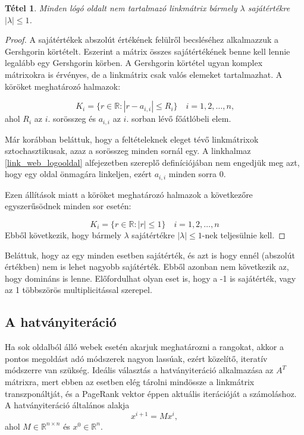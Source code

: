 \documentclass[12pt,a4paper]{article}
\newtheorem{tetel}{Tétel}
\begin{document}
\begin{tetel}
	Minden lógó oldalt nem tartalmazó linkmátrix bármely $\lambda$ sajátértékre $ |\lambda| \leq 1$.
\end{tetel}
\begin{proof}
	A sajátértékek abszolút értékének felülről becsléséhez alkalmazzuk a Gershgorin körtételt. Eszerint a mátrix összes sajátértékének benne kell lennie legalább egy Gershgorin körben. A Gershgorin körtétel ugyan komplex mátrixokra is érvényes, de a linkmátrix csak valós elemeket tartalmazhat. A köröket meghatározó halmazok: 
	
	\[ K_i = \{ r \in \mathbb{R}: |r - a_{i,i}| \leq R_i \} \quad i = 1,2,\ldots,n \text{,} \]
	ahol $R_i$ az $i$. sorösszeg és $a_{i,i}$ az $i$. sorban lévő főátlóbeli elem.
	
	Már korábban beláttuk, hogy a feltételeknek eleget tévő linkmátrixok sztochasztikusak, azaz a sorösszeg minden sornál egy. A linkhalmaz \ref{link_web_logooldal} alfejezetben szereplő definíciójában nem engedjük meg azt, hogy egy oldal önmagára linkeljen, ezért $a_{i,i}$ minden sorra 0.
	
	Ezen állítások miatt a köröket meghatározó halmazok a következőre egyszerűsödnek minden sor esetén:
	
	\[ K_i = \{ r \in \mathbb{R}: |r| \leq 1 \} \quad i = 1,2,\ldots,n \]
	Ebből következik, hogy bármely $\lambda$ sajátértékre $ |\lambda| \leq 1$-nek teljesülnie kell.
\end{proof}

Beláttuk, hogy az egy minden esetben sajátérték, és azt is hogy ennél (abszolút értékben) nem is lehet nagyobb sajátérték. Ebből azonban nem következik az, hogy domináns is lenne. Előfordulhat olyan eset is, hogy a -1 is sajátérték, vagy az 1 többszörös multiplicitással szerepel.

\subsection{A hatványiteráció}

Ha sok oldalból álló webek esetén akarjuk meghatározni a rangokat, akkor a pontos megoldást adó módszerek nagyon lassúak, ezért közelítő, iteratív módszerre van szükség. Ideális választás a hatványiteráció alkalmazása az $A^T$ mátrixra, mert ebben az esetben elég tárolni mindössze a linkmátrix transzponáltját, és a PageRank vektor éppen aktuális iterációját a számoláshoz. A hatványiteráció általános alakja
\[ x^{i+1} = M x^i, \]
ahol $M \in \mathbb{R}^{n \times n}$ és $x^0 \in \mathbb{R}^n$.
\vspace{0.2cm}
\end{document}
